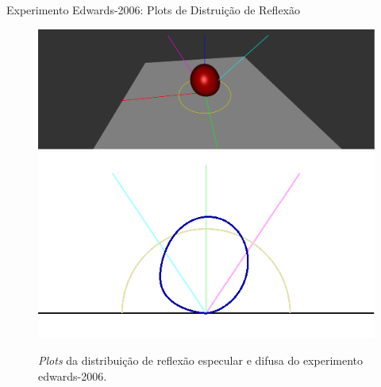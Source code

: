 \begin{frame}{Experimento Edwards-2006: Plots de Distruição de Reflexão}
\begin{figure}[H]
  
\caption{\small{\textit{Plots} da distribuição de reflexão especular e difusa do experimento edwards-2006.}}
    \label{fig-edwards-2006-plots}
    \vspace{42px}
  \includegraphics[width=\linewidth]{./Imagens/brdfs/edwards-2006-3D-plot}
\endminipage\hfill
{}
  \includegraphics[width=\linewidth]{./Imagens/brdfs/edwards-2006-polar-plot.png}
\endminipage\hfill
\end{figure}
\end{frame}

